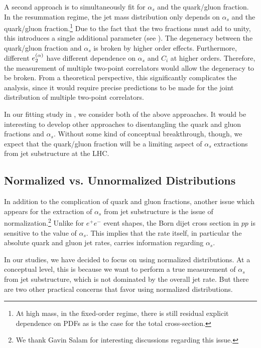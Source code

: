 A second approach is to simultaneously fit for $\alpha_s$ and the quark/gluon fraction.
%
In the resummation regime, the jet mass distribution only depends on $\alpha_s$ and the quark/gluon fraction.\footnote{At high mass, in the fixed-order regime, there is still residual explicit dependence on PDFs as is the case for the total cross-section.}
%
Due to the fact that the two fractions must add to unity, this introduces a single additional parameter (see ).
%
The degeneracy between the quark/gluon fraction and $\alpha_s$ is broken by higher order effects.
%
Furthermore, different $e_{2}^{(\alpha)}$ have different dependence on $\alpha_s$ and $C_i$ at higher orders.
%
Therefore, the measurement of multiple two-point correlators would allow the degeneracy to be broken.
%
From a theoretical perspective, this significantly complicates the analysis, since it would require precise
predictions to be made for the joint distribution of multiple two-point correlators.


In our fitting study in , we consider both of the above approaches.
%
It would be interesting to develop other approaches to disentangling the quark and gluon fractions and $\alpha_s$.
%
Without some kind of conceptual breakthrough, though, we expect that the quark/gluon fraction will be a limiting aspect of $\alpha_s$ extractions from jet substructure at the LHC.

\subsection{Normalized vs. Unnormalized Distributions}

In addition to the complication of quark and gluon fractions, another issue which appears for the extraction of $\alpha_s$ from jet substructure is the issue of normalization.\footnote{We thank Gavin Salam for interesting discussions regarding this issue.  }
%
Unlike for $e^+e^-$ event shapes, the Born dijet cross section in $pp$ is sensitive to the value of $\alpha_s$.
%
This implies that the rate itself, in particular the absolute quark and gluon jet rates, carries information regarding $\alpha_s$. 

In our studies, we have decided to focus on using normalized distributions.
%
At a conceptual level, this is because we want to perform a true measurement of $\alpha_s$ from jet substructure, which is not dominated by the overall jet rate.
%
But there are two other practical concerns that favor using normalized distributions.

